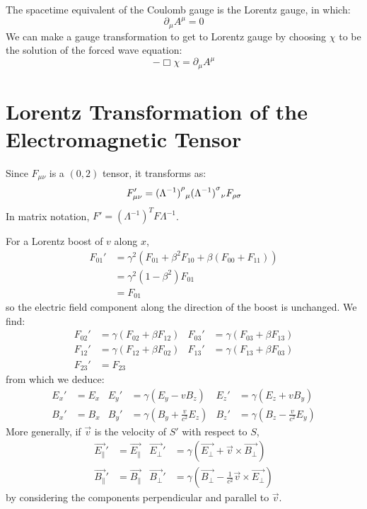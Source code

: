 \documentclass[../Main.tex]{subfiles}
\begin{document}
The spacetime equivalent of the Coulomb gauge is the Lorentz gauge, in which:
\begin{equation*}
    \partial_\mu A^\mu = 0
\end{equation*}
We can make a gauge transformation to get to Lorentz gauge by choosing $\chi$ to be the solution of the forced wave equation:
\begin{equation*}
    -\Box \chi = \partial_\mu A^\mu
\end{equation*}
\section{Lorentz Transformation of the Electromagnetic Tensor}
Since $F_{\mu \nu}$ is a $(0, 2)$ tensor, it transforms as:
\begin{equation*}
    F_{\mu \nu}' = \indx{(\Lambda^{-1})}{\rho}{\mu} \indx{(\Lambda^{-1})}{\sigma}{\nu} F_{\rho \sigma}
\end{equation*}
In matrix notation, $F' = (\Lambda^{-1})^T F \Lambda^{-1}$.

For a Lorentz boost of $v$ along $x$,
\begin{align*}
    F_{01}' &= \gamma^2 (F_{01} + \beta^2 F_{10} + \beta(F_{00} + F_{11})) \\
    &= \gamma^2 (1 - \beta^2) F_{01} \\
    &= F_{01}
\end{align*}
so the electric field component along the direction of the boost is unchanged. We find:
\begin{align*}
    F_{02}' &= \gamma (F_{02} + \beta F_{12}) & F_{03}' &= \gamma(F_{03} + \beta F_{13}) \\
    F_{12}' &= \gamma (F_{12} + \beta F_{02}) & F_{13}' &= \gamma(F_{13} + \beta F_{03}) \\
    F_{23}' &= F_{23}
\end{align*}
from which we deduce:
\begin{align*}
    E_x' &= E_x & E_y' &= \gamma (E_y - v B_z) & E_z' &= \gamma (E_z + v B_y) \\
    B_x' &= B_x & B_y' &= \gamma \left(B_y + \frac{v}{c^2} E_z\right) & B_z' &= \gamma \left(B_z - \frac{v}{c^2} E_y\right)
\end{align*}
More generally, if $\vec{v}$ is the velocity of $S'$ with respect to $S$,
\begin{align*}
    \vec{E_\parallel}' &= \vec{E_\parallel} & \vec{E_\perp}' &= \gamma (\vec{E_\perp} + \vec{v} \times \vec{B_\perp}) \\
    \vec{B_\parallel}' &= \vec{B_\parallel} & \vec{B_\perp}' &= \gamma \left(\vec{B_\perp} - \frac{1}{c^2} \vec{v} \times \vec{E_\perp}\right)
\end{align*}
by considering the components perpendicular and parallel to $\vec{v}$.
\end{document}
